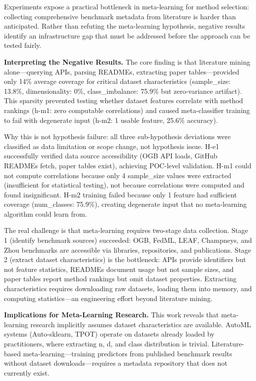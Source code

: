 
Experiments expose a practical bottleneck in meta-learning for method selection: collecting comprehensive benchmark metadata from literature is harder than anticipated. Rather than refuting the meta-learning hypothesis, negative results identify an infrastructure gap that must be addressed before the approach can be tested fairly.

\textbf{Interpreting the Negative Results.} The core finding is that literature mining alone---querying APIs, parsing READMEs, extracting paper tables---provided only 14\% average coverage for critical dataset characteristics (sample\_size: 13.8\%, dimensionality: 0\%, class\_imbalance: 75.9\% but zero-variance artifact). This sparsity prevented testing whether dataset features correlate with method rankings (h-m1: zero computable correlations) and caused meta-classifier training to fail with degenerate input (h-m2: 1 usable feature, 25.6\% accuracy).

Why this is not hypothesis failure: all three sub-hypothesis deviations were classified as data limitation or scope change, not hypothesis issue. H-e1 successfully verified data source accessibility (OGB API loads, GitHub READMEs fetch, paper tables exist), achieving POC-level validation. H-m1 could not compute correlations because only 4 sample\_size values were extracted (insufficient for statistical testing), not because correlations were computed and found insignificant. H-m2 training failed because only 1 feature had sufficient coverage (num\_classes: 75.9\%), creating degenerate input that no meta-learning algorithm could learn from.

The real challenge is that meta-learning requires two-stage data collection. Stage 1 (identify benchmark sources) succeeded: OGB, FedML, LEAF, Champneys, and Zhou benchmarks are accessible via libraries, repositories, and publications. Stage 2 (extract dataset characteristics) is the bottleneck: APIs provide identifiers but not feature statistics, READMEs document usage but not sample sizes, and paper tables report method rankings but omit dataset properties. Extracting characteristics requires downloading raw datasets, loading them into memory, and computing statistics---an engineering effort beyond literature mining.

\textbf{Implications for Meta-Learning Research.} This work reveals that meta-learning research implicitly assumes dataset characteristics are available. AutoML systems (Auto-sklearn, TPOT) operate on datasets already loaded by practitioners, where extracting n, d, and class distribution is trivial. Literature-based meta-learning---training predictors from published benchmark results without dataset downloads---requires a metadata repository that does not currently exist.

